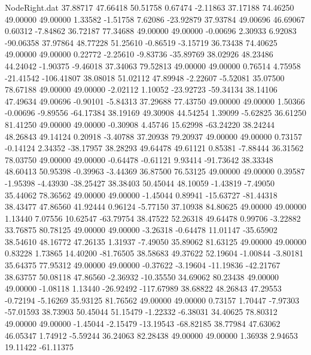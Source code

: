 \begin{filecontents}{NodeRight.dat}
  37.88717   47.66418   50.51758     0.67474   -2.11863   37.17188   74.46250   49.00000   49.00000    1.33582   -1.51758    7.62086  -23.92879
  37.93784   49.00696   46.69067     0.60312   -7.84862   36.72187   77.34688   49.00000   49.00000   -0.00696    2.30933    6.92083  -90.06358
  37.97864   48.77228   51.25610    -0.86519   -3.15719   36.73438   74.40625   49.00000   49.00000    0.22772   -2.25610   -9.83736  -35.89769
  38.02926   48.23486   44.24042    -1.90375   -9.46018   37.34063   79.52813   49.00000   49.00000    0.76514    4.75958  -21.41542 -106.41807
  38.08018   51.02112   47.89948    -2.22607   -5.52081   35.07500   78.67188   49.00000   49.00000   -2.02112    1.10052  -23.92723  -59.34134
  38.14106   47.49634   49.00696    -0.90101   -5.84313   37.29688   77.43750   49.00000   49.00000    1.50366   -0.00696   -9.89556  -64.17384
  38.19169   49.30908   44.54254     1.39099   -5.62825   36.61250   81.41250   49.00000   49.00000   -0.30908    4.45746   15.62998  -63.24220
  38.24244   48.26843   49.14124     0.20918   -3.40788   37.20938   79.20937   49.00000   49.00000    0.73157   -0.14124    2.34352  -38.17957
  38.28293   49.64478   49.61121     0.85381   -7.88444   36.31562   78.03750   49.00000   49.00000   -0.64478   -0.61121    9.93414  -91.73642
  38.33348   48.60413   50.95398    -0.39963   -3.44369   36.87500   76.53125   49.00000   49.00000    0.39587   -1.95398   -4.43930  -38.25427
  38.38403   50.45044   48.10059    -1.43819   -7.49050   35.44062   78.36562   49.00000   49.00000   -1.45044    0.89941  -15.63727  -81.44318
  38.43477   47.86560   41.92444     0.96124   -5.77150   37.10938   84.80625   49.00000   49.00000    1.13440    7.07556   10.62547  -63.79754
  38.47522   52.26318   49.64478     0.99706   -3.22882   33.76875   80.78125   49.00000   49.00000   -3.26318   -0.64478   11.01147  -35.65902
  38.54610   48.16772   47.26135     1.31937   -7.49050   35.89062   81.63125   49.00000   49.00000    0.83228    1.73865   14.40200  -81.76505
  38.58683   49.37622   52.19604    -1.00844   -3.80181   35.64375   77.95312   49.00000   49.00000   -0.37622   -3.19604  -11.19836  -42.21767
  38.63757   50.08118   47.86560    -2.36932  -10.35550   34.69062   80.23438   49.00000   49.00000   -1.08118    1.13440  -26.92492 -117.67989
  38.68822   48.26843   47.29553    -0.72194   -5.16269   35.93125   81.76562   49.00000   49.00000    0.73157    1.70447   -7.97303  -57.01593
  38.73903   50.45044   51.15479    -1.22332   -6.38031   34.40625   78.80312   49.00000   49.00000   -1.45044   -2.15479  -13.19543  -68.82185
  38.77984   47.63062   46.05347     1.74912   -5.59244   36.24063   82.28438   49.00000   49.00000    1.36938    2.94653   19.11422  -61.11375

\end{filecontents}
